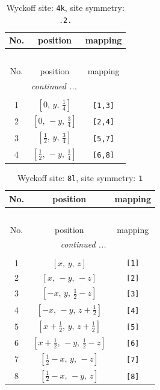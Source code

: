 \documentclass[fleqn,8pt]{jsarticle}
\begin{document}
\renewcommand{\arraystretch}{1.2}
\begin{longtable}{ccc}
\caption{Wyckoff site: {\tt 4k}, site symmetry: {\tt .2.}}
 \\
 \hline \hline
No. & position & mapping \\ \hline \endfirsthead

\multicolumn{2}{l}{\tablename\ \thetable{}} \\
 \hline \hline
No. & position & mapping \\ \hline \endhead

 \hline \hline
\multicolumn{2}{r}{\footnotesize\it continued ...} \\ \endfoot

 \hline \hline
\multicolumn{2}{r}{} \\ \endlastfoot

1 & $\left[ 0,\, y,\, \frac{1}{4} \right]$ & {\tt [1,3]} \\ \hline
2 & $\left[ 0,\, - y,\, \frac{3}{4} \right]$ & {\tt [2,4]} \\ \hline
3 & $\left[ \frac{1}{2},\, y,\, \frac{3}{4} \right]$ & {\tt [5,7]} \\ \hline
4 & $\left[ \frac{1}{2},\, - y,\, \frac{1}{4} \right]$ & {\tt [6,8]} \\
\end{longtable}
\renewcommand{\arraystretch}{1.2}
\begin{longtable}{ccc}
\caption{Wyckoff site: {\tt 8l}, site symmetry: {\tt 1}}
 \\
 \hline \hline
No. & position & mapping \\ \hline \endfirsthead

\multicolumn{2}{l}{\tablename\ \thetable{}} \\
 \hline \hline
No. & position & mapping \\ \hline \endhead

 \hline \hline
\multicolumn{2}{r}{\footnotesize\it continued ...} \\ \endfoot

 \hline \hline
\multicolumn{2}{r}{} \\ \endlastfoot

1 & $\left[ x,\, y,\, z \right]$ & {\tt [1]} \\ \hline
2 & $\left[ x,\, - y,\, - z \right]$ & {\tt [2]} \\ \hline
3 & $\left[ - x,\, y,\, \frac{1}{2} - z \right]$ & {\tt [3]} \\ \hline
4 & $\left[ - x,\, - y,\, z + \frac{1}{2} \right]$ & {\tt [4]} \\ \hline
5 & $\left[ x + \frac{1}{2},\, y,\, z + \frac{1}{2} \right]$ & {\tt [5]} \\ \hline
6 & $\left[ x + \frac{1}{2},\, - y,\, \frac{1}{2} - z \right]$ & {\tt [6]} \\ \hline
7 & $\left[ \frac{1}{2} - x,\, y,\, - z \right]$ & {\tt [7]} \\ \hline
8 & $\left[ \frac{1}{2} - x,\, - y,\, z \right]$ & {\tt [8]} \\
\end{longtable}
\end{document}
